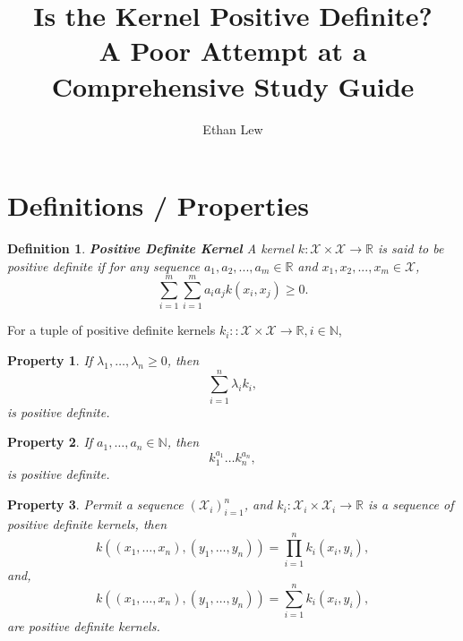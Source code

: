 \documentclass{article}[12pt]
\newtheorem{prp}{Property}
\newtheorem{defn}{Definition}
\begin{document}
\title{Is the Kernel Positive Definite? \\ \large A Poor Attempt at a Comprehensive Study Guide}

\author{Ethan Lew}

\maketitle

\section{Definitions / Properties}

\begin{defn}{\textbf{Positive Definite Kernel}}
A kernel $k : \mathcal X \times \mathcal X \rightarrow \mathbb R$ is said to be positive definite if for any sequence $a_1,a_2,...,a_m \in \mathbb R$ and $x_1, x_2,...,x_m \in \mathcal X$,
\begin{equation} \label{equ:pdcond}
\sum_{i=1}^{m} \sum_{i=1}^{m} a_i a_j k(x_i, x_j) \ge 0.
\end{equation}
\label{def:pd}
\end{defn}

For a tuple of positive definite kernels $k_i : : \mathcal X \times \mathcal X \rightarrow \mathbb R, i \in \mathbb N$, 
\begin{prp}{} \label{prp:sum}
If $\lambda_{1}, \ldots, \lambda_{n} \geq 0$, then
\begin{equation}
\sum_{i=1}^{n} \lambda_{i} k_{i},
\end{equation}
is positive definite.
\end{prp}

\begin{prp} \label{prp:mult}
If $a_{1}, \dots, a_{n} \in \mathbb{N}$, then
\begin{equation}
k_{1}^{a_{1}} \ldots k_{n}^{a_{n}},
\end{equation}
is positive definite.
\end{prp}

\begin{prp}
Permit a sequence $\left( \mathcal X_i \right)_{i=1}^{n}$, and $k_i : \mathcal{X}_{i} \times \mathcal{X}_{i} \rightarrow \mathbb R $ is a sequence of positive definite kernels, then
\begin{equation}
k\left(\left(x_{1}, \ldots, x_{n}\right),\left(y_{1}, \ldots, y_{n}\right)\right)=\prod_{i=1}^{n} k_{i}\left(x_{i}, y_{i}\right),
\end{equation}
and,
\begin{equation}
k\left(\left(x_{1}, \ldots, x_{n}\right),\left(y_{1}, \ldots, y_{n}\right)\right)=\sum_{i=1}^{n} k_{i}\left(x_{i}, y_{i}\right),
\end{equation}
are positive definite kernels.
\end{prp}
\end{document}
